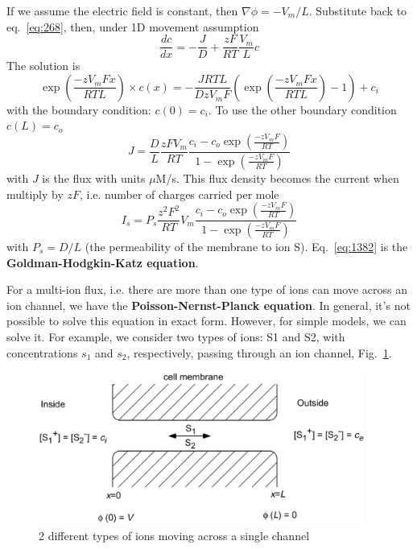 If we assume the electric field is constant, then $\nabla
\phi=-V_m/L$. Substitute back to eq.~\eqref{eq:268}, then, under 1D
movement assumption
\begin{equation}
  \label{eq:1379}
  \frac{dc}{dx} = -\frac{J}{D} + \frac{zF}{RT}\frac{V_m}{L}c
\end{equation}
The solution is
\begin{equation}
  \label{eq:1380}
  \exp(\frac{-zV_mFx}{RTL}) \times c(x) =
  -\frac{JRTL}{DzV_mF}\left(\exp(\frac{-zV_mFx}{RTL})-1\right) + c_i
\end{equation}
with the boundary condition: $c(0)=c_i$. To use the other boundary
condition $c(L)=c_o$
\begin{equation}
  \label{eq:1381}
  J = \frac{D}{L}\frac{zFV_m}{RT}\frac{c_i-c_o\exp(\frac{-zV_mF}{RT})}{1-\exp(\frac{-zV_mF}{RT})}
\end{equation}
with $J$ is the flux with units $\mu$M/s. This flux density becomes
the current when multiply by $zF$, i.e. number of charges carried per
mole
\begin{equation}
  \label{eq:1382}
  I_s = P_s\frac{z^2F^2}{RT}V_m\frac{c_i-c_o\exp(\frac{-zV_mF}{RT})}{1-\exp(\frac{-zV_mF}{RT})}
\end{equation}
with $P_s=D/L$ (the permeability of the membrane to ion
S). Eq.~\eqref{eq:1382} is the {\bf Goldman-Hodgkin-Katz
  equation}.


For a multi-ion flux, i.e. there are more than one type of ions can
move across an ion channel, we have the
{\bf Poisson-Nernst-Planck equation}. In general, it's not possible to
solve this equation in exact form. However, for simple models, we can
solve it. For example, we consider two types of ions: S1 and S2, with
concentrations $s_1$ and $s_2$, respectively, passing through an ion
channel, Fig.~\ref{fig:multi-ions}.

\begin{figure}[hbt]
  \centerline{\includegraphics[height=5cm,
    angle=0]{./images/multi-ions.eps}}
  \caption{2 different types of ions moving across a single channel}
  \label{fig:multi-ions}
\end{figure}

